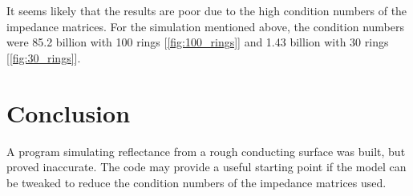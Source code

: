 \documentclass[etd,twoside,senior,noacknowledgments]{BYUPhys}
\begin{document}
It seems likely that the results are poor due to the high condition numbers of the impedance matrices. For the simulation mentioned above, the condition numbers were 85.2 billion with 100 rings [\ref{fig:100_rings}] and 1.43 billion with 30 rings [\ref{fig:30_rings}].







\chapter{Conclusion}\label{chap:conclusion}

A program simulating reflectance from a rough conducting surface was built, but proved inaccurate. The code may provide a useful starting point if the model can be tweaked to reduce the condition numbers of the impedance matrices used.






\end{document}
